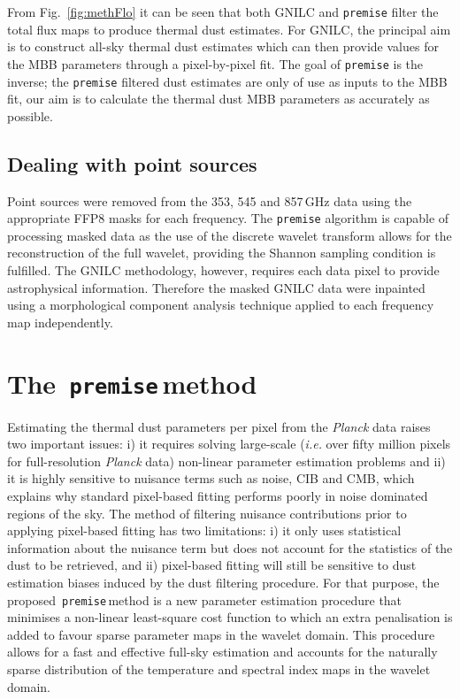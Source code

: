 \documentclass[a4paper,fleqn,usenatbib]{mnras}
\newcommand{\premise}{\texttt{premise}}
\begin{document}
From Fig.~\ref{fig:methFlo} it can be seen that both GNILC and {\texttt{premise}} filter the total flux maps to produce thermal dust estimates. For GNILC, the principal aim is to construct all-sky thermal dust estimates which can then provide values for the MBB parameters through a pixel-by-pixel fit. The goal of {\texttt{premise}} is the inverse; the {\texttt{premise}} filtered dust estimates are only of use as inputs to the MBB fit, our aim is to calculate the thermal dust MBB parameters as accurately as possible. 

\subsection{Dealing with point sources} \label{scontrib}

Point sources were removed from the 353, 545 and 857\,GHz data using the appropriate FFP8 masks for each frequency. The {\texttt{premise}} algorithm is capable of processing masked data as the use of the discrete wavelet transform allows for the reconstruction of the full wavelet, providing the Shannon sampling condition is fulfilled. The GNILC methodology, however, requires each data pixel to provide astrophysical information. Therefore the masked GNILC data were inpainted using a morphological component analysis technique \citep{inpaint} applied to each frequency map independently.   

\section{The\, \premise \,method}
\label{sec:method}

Estimating the thermal dust parameters per pixel from the {\it{Planck}} data raises two important issues: i) it requires solving large-scale ({\it i.e.} over fifty million pixels for full-resolution {\it{Planck}} data) non-linear parameter estimation problems and ii) it is highly sensitive to nuisance terms such as noise, CIB and CMB, which explains why standard pixel-based fitting performs poorly in noise dominated regions of the sky. The method of filtering nuisance contributions prior to applying pixel-based fitting has two limitations: i) it only uses statistical information about the nuisance term but does not account for the statistics of the dust to be retrieved, and ii) pixel-based fitting will still be sensitive to dust estimation biases induced by the dust filtering procedure. For that purpose, the proposed\, \premise \,method is a new parameter estimation procedure that minimises a non-linear least-square cost function to which an extra penalisation is added to favour sparse parameter maps in the wavelet domain. This procedure allows for a fast and effective full-sky estimation and accounts for the naturally sparse distribution of the temperature and spectral index maps in the wavelet domain.
\end{document}
